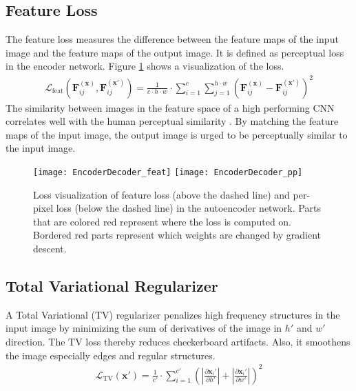 \subsection{Feature Loss}
The feature loss measures the difference between the feature maps of the input image and the feature maps of the output image. It is defined as perceptual loss in the encoder network. Figure \ref{fig:autoencoder_loss} shows a visualization of the loss.
\begin{align}
\mathcal{L}_{\mathrm{feat}} 
\left(
\mathbf{F}^{(\mathbf{x})}_{ij}, 
\mathbf{F}^{(\mathbf{x}')}_{ij}
\right)
= 
\frac
{1}
{c \cdot h \cdot w} 
\cdot
\sum_{i=1}^{c} 
\sum_{j=1}^{h \cdot w} 
\left( 
\mathbf{F}^{(\mathbf{x})}_{ij} 
- 
\mathbf{F}^{(\mathbf{x}')}_{ij}
\right)
^2
\end{align}
The similarity between images in the feature space of a high performing CNN correlates well with the human perceptual similarity \cite{LPIPS_2018_CVPR}. By matching the feature maps of the input image, the output image is urged to be perceptually similar to the input image.
\begin{figure}[!ht]
	\centering
  	\texttt{[image: EncoderDecoder\_feat]}
  	\vspace{2em}
	\hdashrule{\textwidth}{0.4pt}{3mm}
	\vspace{3em}
  	\texttt{[image: EncoderDecoder\_pp]}
	\caption{Loss visualization of feature loss (above the dashed line) and per-pixel loss (below the dashed line) in the autoencoder network. Parts that are colored red represent where the loss is computed on. Bordered red parts represent which weights are changed by gradient descent.}
	\label{fig:autoencoder_loss}
\end{figure}

\subsection{Total Variational Regularizer}
A Total Variational (TV) regularizer penalizes high frequency structures in the input image by minimizing the sum of derivatives of the image in $h'$ and $w'$ direction. The TV loss thereby reduces checkerboard artifacts. Also, it smoothens the image especially edges and regular structures.
\begin{align}
\mathcal{L}_{\mathrm{TV}} 
\left(
\mathbf{x}'
\right)
= 
\frac
{1}
{c'} 
\cdot
\sum_{i=1}^{c'} 
\left(
\left|
\frac
{\partial \mathbf{x}_i'}
{\partial h'}
\right|
+
\left|
\frac
{\partial \mathbf{x}_i'}
{\partial w'}
\right|
\right)
^2
\end{align}

